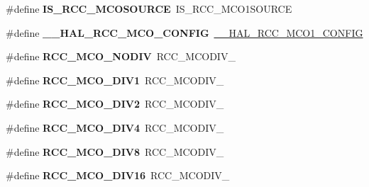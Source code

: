 \begin{DoxyCompactItemize}
\#define {\bfseries I\+S\+\_\+\+R\+C\+C\+\_\+\+M\+C\+O\+S\+O\+U\+R\+CE}~I\+S\+\_\+\+R\+C\+C\+\_\+\+M\+C\+O1\+S\+O\+U\+R\+CE
\item 
\mbox{\label{group___h_a_l___r_c_c___aliased_ga4a5994f41cd6798807bf8672ec3dc423}} 
\#define {\bfseries \+\_\+\+\_\+\+H\+A\+L\+\_\+\+R\+C\+C\+\_\+\+M\+C\+O\+\_\+\+C\+O\+N\+F\+IG}~\hyperlink{group___r_c_c_ex___m_c_ox___clock___config_ga7e5f7f1efc92794b6f0e96068240b45e}{\+\_\+\+\_\+\+H\+A\+L\+\_\+\+R\+C\+C\+\_\+\+M\+C\+O1\+\_\+\+C\+O\+N\+F\+IG}
\item 
\mbox{\label{group___h_a_l___r_c_c___aliased_ga897ae3aa8cfe31f7b00de98637db45d5}} 
\#define {\bfseries R\+C\+C\+\_\+\+M\+C\+O\+\_\+\+N\+O\+D\+IV}~R\+C\+C\+\_\+\+M\+C\+O\+D\+I\+V\+\_
\item 
\mbox{\label{group___h_a_l___r_c_c___aliased_ga411caf05a68e3bd8f14150c14d1f8404}} 
\#define {\bfseries R\+C\+C\+\_\+\+M\+C\+O\+\_\+\+D\+I\+V1}~R\+C\+C\+\_\+\+M\+C\+O\+D\+I\+V\+\_
\item 
\mbox{\label{group___h_a_l___r_c_c___aliased_ga49e93c717ea6b0916051b085aa595ecb}} 
\#define {\bfseries R\+C\+C\+\_\+\+M\+C\+O\+\_\+\+D\+I\+V2}~R\+C\+C\+\_\+\+M\+C\+O\+D\+I\+V\+\_
\item 
\mbox{\label{group___h_a_l___r_c_c___aliased_gadde6fd8dbc7f1e750aea3903bedffa7d}} 
\#define {\bfseries R\+C\+C\+\_\+\+M\+C\+O\+\_\+\+D\+I\+V4}~R\+C\+C\+\_\+\+M\+C\+O\+D\+I\+V\+\_
\item 
\mbox{\label{group___h_a_l___r_c_c___aliased_ga00b1ed5dae888fa26fcaf66429c617da}} 
\#define {\bfseries R\+C\+C\+\_\+\+M\+C\+O\+\_\+\+D\+I\+V8}~R\+C\+C\+\_\+\+M\+C\+O\+D\+I\+V\+\_
\item 
\mbox{\label{group___h_a_l___r_c_c___aliased_ga4e8e30ec40f362037055d5977a9e2ea0}} 
\#define {\bfseries R\+C\+C\+\_\+\+M\+C\+O\+\_\+\+D\+I\+V16}~R\+C\+C\+\_\+\+M\+C\+O\+D\+I\+V\+\_
\item 
\mbox{\label{group___h_a_l___r_c_c___aliased_ga26c54546e41690456e3a57cd46a3b16a}} 

\end{DoxyCompactItemize}
